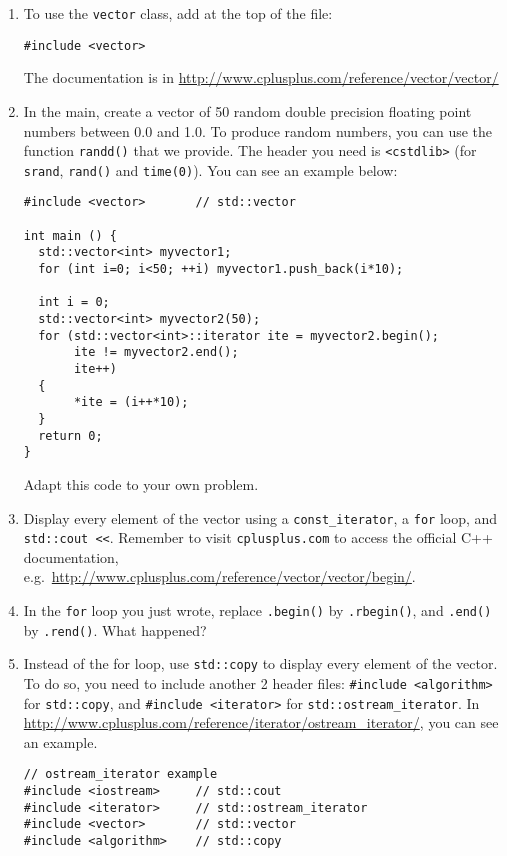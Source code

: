 \begin{enumerate}

\item To use the \verb+vector+ class, add at the top of the file:
\begin{lstlisting}
#include <vector>
\end{lstlisting}
The documentation is in \url{http://www.cplusplus.com/reference/vector/vector/}

\item In the main, create a vector of 50 random double precision floating point numbers between 0.0 and 1.0. To produce random numbers, you can use the function \verb+randd()+ that we provide. The header you need is \verb+<cstdlib>+ (for \verb+srand+, \verb+rand()+ and \verb+time(0)+). 
You can see an example below:
\begin{lstlisting}
#include <vector>       // std::vector

int main () {
  std::vector<int> myvector1;
  for (int i=0; i<50; ++i) myvector1.push_back(i*10);

  int i = 0;
  std::vector<int> myvector2(50);
  for (std::vector<int>::iterator ite = myvector2.begin();
       ite != myvector2.end();
       ite++)
  {
       *ite = (i++*10);
  } 
  return 0;
}
\end{lstlisting}
Adapt this code to your own problem.

\item Display every element of the vector using a \verb+const_iterator+, a \verb+for+ loop, and \verb+std::cout <<+. 
Remember to visit \verb+cplusplus.com+ to access the official C++ documentation, e.g.~\url{http://www.cplusplus.com/reference/vector/vector/begin/}.

\item In the \verb+for+ loop you just wrote, replace \verb+.begin()+ by \verb+.rbegin()+, and \verb+.end()+ by \verb+.rend()+. What happened?

\item Instead of the for loop, use \verb+std::copy+ to display every element of the vector. To do so, you need to include another 2 header files:
\verb+#include <algorithm>+ for \verb+std::copy+, and \verb+#include <iterator>+ for \verb+std::ostream_iterator+. 
In \url{http://www.cplusplus.com/reference/iterator/ostream_iterator/}, you can see an example. 
\begin{lstlisting}
// ostream_iterator example
#include <iostream>     // std::cout
#include <iterator>     // std::ostream_iterator
#include <vector>       // std::vector
#include <algorithm>    // std::copy


\end{lstlisting}
\end{enumerate}
